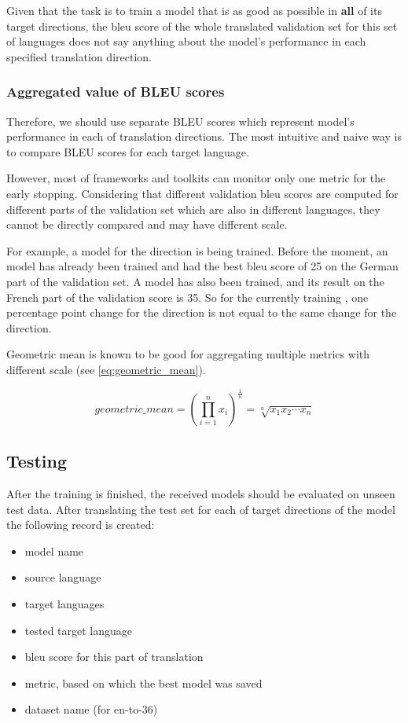Given that the task is to train a model that is as good as possible in
\textbf{all} of its target directions, the \acrshort{bleu} score of
the whole translated validation set for this set of languages does not
say anything about the model's performance in each specified
translation direction.

\subsubsection*{Aggregated value of BLEU scores}

Therefore, we should use separate BLEU scores which represent
model's performance in each of translation directions.
The most intuitive and naive way is to compare BLEU scores
for each target language.

However, most of frameworks and toolkits can monitor only one metric
for the early stopping.
Considering that different validation \acrshort{bleu} scores
are computed for different parts of the validation set 
which are also in different languages, they cannot be directly compared
and may have different scale.

For example, a model for the  direction is being
trained.
Before the moment, an  model has already been trained and
had the best \acrshort{bleu} score of 25 on the German part of the
validation set.
A  model has also been trained, and its result on the
French part of the validation score is 35.
So for the currently training , one percentage point
change for the  direction is not equal to the same change for the
 direction.

Geometric mean is known to be good for aggregating multiple metrics
with different scale (see \cref{eq:geometric_mean}).

\begin{equation}
\label{eq:geometric_mean}
	geometric\_mean = \left(\prod _{i=1}^{n}x_{i}\right)^{\frac {1}{n}}={\sqrt[{n}]{x_{1}x_{2}\cdots x_{n}}}
\end{equation}

\subsection{Testing}
\label{subsection:testing}

After the training is finished, the received models should be evaluated on unseen
test data.
After translating the test set for each of target directions of the model
the following record is created:
\begin{itemize}
	\item model name
	\item source language
	\item target languages
	\item tested target language
	\item \acrshort{bleu} score for this part of translation
	\item metric, based on which the best model was saved
	\item dataset name (for \gls{en-to-36})
\end{itemize}

